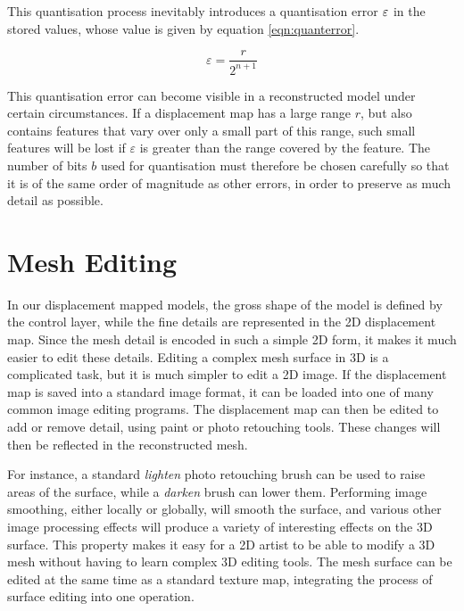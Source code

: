 This quantisation process inevitably introduces a quantisation error $\varepsilon\symbol{quanterror}$ in the stored values, whose value is given by equation \ref{eqn:quanterror}.

\begin{equation}\label{eqn:quanterror}
\varepsilon = \frac{r}{2^{n+1}}
\end{equation}

This quantisation error can become visible in a reconstructed model under certain circumstances. If a displacement map has a large range $r$, but also contains features that vary over only a small part of this range, such small features will be lost if $\varepsilon$ is greater than the range covered by the feature. The number of bits $b$ used for quantisation must therefore be chosen carefully so that it is of the same order of magnitude as other errors, in order to preserve as much detail as possible.

\section{\label{sec:dispmapanim:editing}Mesh Editing}

In our displacement mapped models, the gross shape of the model is defined by the control layer, while the fine details are represented in the 2D displacement map. Since the mesh detail is encoded in such a simple 2D form, it makes it much easier to edit these details. Editing a complex mesh surface in 3D is a complicated task, but it is much simpler to edit a 2D image. If the displacement map is saved into a standard image format, it can be loaded into one of many common image editing programs. The displacement map can then be edited to add or remove detail, using paint or photo retouching tools. These changes will then be reflected in the reconstructed mesh.

For instance, a standard {\it lighten} photo retouching brush can be used to raise areas of the surface, while a {\it darken} brush can lower them. Performing image smoothing, either locally or globally, will smooth the surface, and various other image processing effects will produce a variety of interesting effects on the 3D surface. This property makes it easy for a 2D artist to be able to modify a 3D mesh without having to learn complex 3D editing tools. The mesh surface can be edited at the same time as a standard texture map, integrating the process of surface editing into one operation.

